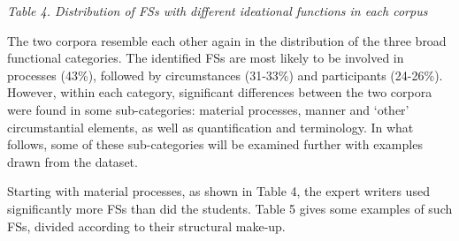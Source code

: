 \begin{styleStandard}
\textit{Table 4. Distribution of FSs with different ideational functions in each corpus}
\end{styleStandard}

\begin{styleStandard}
The two corpora resemble each other again in the distribution of the three broad functional categories. The identified FSs are most likely to be involved in processes (43\%), followed by circumstances (31-33\%) and participants (24-26\%). However, within each category, significant differences between the two corpora were found in some sub-categories: material processes, manner and ‘other’ circumstantial elements, as well as quantification and terminology. In what follows, some of these sub-categories will be examined further with examples drawn from the dataset. 
\end{styleStandard}

\begin{styleStandard}
Starting with material processes, as shown in Table 4, the expert writers used significantly more FSs than did the students. Table 5 gives some examples of such FSs, divided according to their structural make-up. 
\end{styleStandard}

